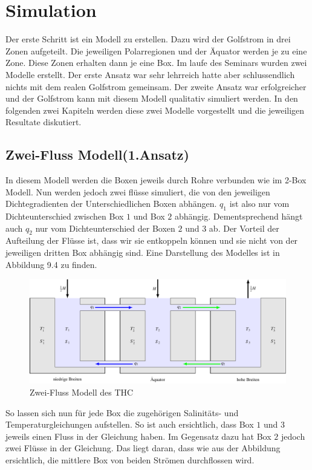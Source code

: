 \section{Simulation}

Der erste Schritt ist ein Modell zu erstellen.
Dazu wird der Golfstrom in drei Zonen aufgeteilt. Die jeweiligen Polarregionen und der Äquator werden je zu eine Zone. Diese Zonen erhalten dann je eine Box.
Im laufe des Seminars wurden zwei Modelle erstellt. Der erste Ansatz war sehr lehrreich hatte aber  schlussendlich nichts mit dem realen Golfstrom gemeinsam. Der zweite Ansatz war erfolgreicher und der Golfstrom kann mit diesem Modell qualitativ simuliert werden.
In den folgenden zwei Kapiteln werden diese zwei Modelle vorgestellt und die jeweiligen Resultate diskutiert.

\subsection{Zwei-Fluss Modell(1.Ansatz)}

In diesem Modell werden die Boxen jeweils durch Rohre verbunden wie im 2-Box Modell. Nun werden jedoch zwei flüsse simuliert, die von den jeweiligen Dichtegradienten der Unterschiedlichen Boxen abhängen. $q_1$ ist also nur vom Dichteunterschied zwischen Box $1$ und Box $2$ abhängig. Dementsprechend hängt auch $q_2$ nur vom Dichteunterschied der Boxen $2$ und $3$ ab.
Der Vorteil der Aufteilung der Flüsse ist, dass wir sie entkoppeln können und sie nicht von der jeweiligen dritten Box abhängig sind.
Eine Darstellung des Modelles ist in Abbildung 9.4 zu finden.

\begin{figure}
	\centering
	\includegraphics[width=14cm]{thermohalin/tikz/3b2f.pdf}
	\caption{Zwei-Fluss Modell des THC}
		\label{thermohalin:3b2f}
\end{figure}

So lassen sich nun für jede Box die zugehörigen Salinitäts- und Temperaturgleichungen aufstellen. So ist auch ersichtlich, dass Box $1$ und $3$ jeweils einen Fluss in der Gleichung haben. Im Gegensatz dazu hat Box $2$ jedoch zwei Flüsse in der Gleichung. Das liegt daran, dass wie aus der Abbildung ersichtlich, die mittlere Box von beiden Strömen durchflossen wird.


